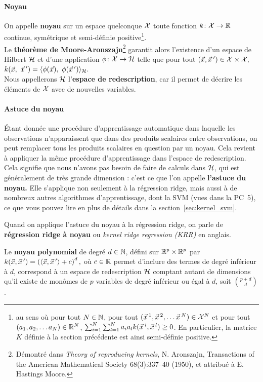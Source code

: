\paragraph{Noyau} On appelle \textbf{noyau} sur un espace quelconque $\mathcal{X}$ toute
fonction $k\colon \mathcal{X} \to \mathbb{R}$ continue, symétrique et semi-définie
positive\footnote{au sens où
pour tout $N \in \mathbb{N}$, pour tout $(\xx^1, \xx^2, \dots \xx^N) \in
  \mathcal{X}^N$ et pour tout $(a_1, a_2, \dots a_N) \in \mathbb{R}^N$, 
  $\sum_{i=1}^N \sum_{l=1}^N a_i a_l k(\xx^i, \xx^l) \geq 0$. En particulier, la matrice $K$ définie à la section précédente est ainsi semi-définie positive.}.\\
Le \textbf{théorème de Moore-Aronszajn}\footnote{Démontré dans \textit{Theory
    of reproducing kernels}, N. Aronszajn, Transactions of the American
  Mathematical Society 68(3):337--40 (1950), et attribué à E. Hastings Moore.}
garantit alors l'existence d'un espace de Hilbert $\mathcal{H}$ et d'une application
$\phi\colon \mathcal{X} \to \mathcal{H}$ telle que pour tout
$(\xx, \xx^\prime) \in \XX \times \XX,$
$k(\xx,~\xx^\prime) = \innerproduct{\phi(\xx),~\phi(\xx^\prime)}_\HH.$\\
Nous
appellerons $\mathcal{H}$ l'\textbf{espace de redescription}, car il permet de décrire les éléments de $\mathcal{X}$ avec de nouvelles variables.

\paragraph{Astuce du noyau} Étant donnée une procédure d'apprentissage
automatique dans laquelle les observations n'apparaissent que dans des produits
scalaires entre observations, on peut remplacer tous les produits scalaires en
question par un noyau. Cela revient à appliquer la même procédure
d'apprentissage dans l'espace de redescription.\\
Cela signifie que nous n'avons pas besoin de faire de calculs dans $\mathcal{H}$, qui
est généralement de très grande dimension : c'est ce que l'on appelle
\textbf{l'astuce du noyau.} Elle s'applique non seulement à la régression
ridge, mais aussi à de nombreux autres algorithmes d'apprentissage, dont la SVM
(vues dans la PC~5), ce que vous pouvez lire en plus de détails dans la
section~\ref{sec:kernel_svm}.

Quand on applique l'astuce du noyau à la régression ridge, on parle de
\textbf{régression ridge à noyau} ou \textit{kernel ridge regression (KRR)} en
anglais.


Le \textbf{noyau polynomial} de degré $d \in \mathbb{N}$,
défini sur $\mathbb{R}^p \times \mathbb{R}^p$ par
$k(\xx, \xx^\prime) = \left( \langle \xx, \xx^\prime \rangle + c\right)^d,$ où $c \in \mathbb{R}$
permet d'inclure des termes de degré inférieur à $d$, correspond à un espace de
redescription $\mathcal{H}$ comptant autant de dimensions qu'il existe de monômes de
$p$ variables de degré inférieur ou égal à $d$, soit $p+d \choose d$.


